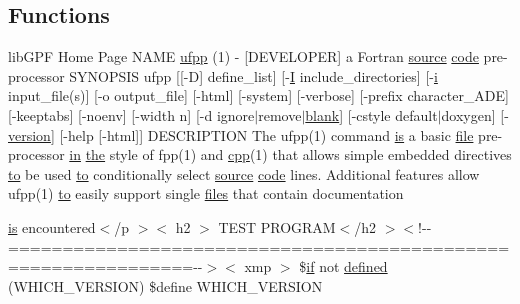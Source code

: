 \subsection*{Functions}
\begin{DoxyCompactItemize}
\item 
lib\+G\+PF Home Page N\+A\+ME \hyperlink{ufpp__overview_81_8txt_a97c20a96bcab81bc74c9d64b001f1202}{ufpp} (1) -\/ \mbox{[}D\+E\+V\+E\+L\+O\+P\+ER\mbox{]} a Fortran \hyperlink{ufpp__overview_81_8txt_a4d6669ece605d05985c83a04dd38e0ad}{source} \hyperlink{ufpp__overview_81_8txt_a74a0615f2d9c4a398d9126096f8092f8}{code} pre-\/processor S\+Y\+N\+O\+P\+S\+IS ufpp \mbox{[}\mbox{[}-\/D\mbox{]} define\+\_\+list\mbox{]} \mbox{[}-\/\hyperlink{continue_87_8txt_ae7b8826453d28f1bdb2fba7e889eb23b}{I} include\+\_\+directories\mbox{]} \mbox{[}-\/\hyperlink{intro__blas1_83_8txt_a8ba82a50c0c2c12d5f6a77f7e4651c0b}{i} input\+\_\+file(s)\mbox{]} \mbox{[}-\/o output\+\_\+file\mbox{]} \mbox{[}-\/html\mbox{]} \mbox{[}-\/system\mbox{]} \mbox{[}-\/verbose\mbox{]} \mbox{[}-\/prefix character\+\_\+\+A\+DE\mbox{]} \mbox{[}-\/keeptabs\mbox{]} \mbox{[}-\/noenv\mbox{]} \mbox{[}-\/width n\mbox{]} \mbox{[}-\/d ignore$\vert$remove$\vert$\hyperlink{M__stopwatch_83_8txt_ab1e613d54e5499697dd1189104a9f678}{blank}\mbox{]} \mbox{[}-\/cstyle default$\vert$doxygen\mbox{]} \mbox{[}-\/\hyperlink{inquiry__stopwatch_83_8txt_aee378be19d20935dd436517beda00ee4}{version}\mbox{]} \mbox{[}-\/help \mbox{[}-\/html\mbox{]}\mbox{]} D\+E\+S\+C\+R\+I\+P\+T\+I\+ON The ufpp(1) command \hyperlink{intro__blas1_83_8txt_a42a91df93f840595de3019ceb5d1df23}{is} a basic \hyperlink{what__overview_81_8txt_a447b56c526e8da30e0dc94673727ee25}{file} pre-\/processor \hyperlink{M__journal_83_8txt_afce72651d1eed785a2132bee863b2f38}{in} \hyperlink{M__stopwatch_83_8txt_a0f266597de2e57eb3aa964927bb30e14}{the} style of fpp(1) and \hyperlink{ufpp__overview_81_8txt_a7d3796ffd1c613d3b65678a150a215df}{cpp}(1) that allows simple embedded directives \hyperlink{M__stopwatch_83_8txt_a97209fd3e34ef701c0a9734280779cbb}{to} be used \hyperlink{M__stopwatch_83_8txt_a97209fd3e34ef701c0a9734280779cbb}{to} conditionally select \hyperlink{ufpp__overview_81_8txt_a4d6669ece605d05985c83a04dd38e0ad}{source} \hyperlink{ufpp__overview_81_8txt_a74a0615f2d9c4a398d9126096f8092f8}{code} lines. Additional features allow ufpp(1) \hyperlink{M__stopwatch_83_8txt_a97209fd3e34ef701c0a9734280779cbb}{to} easily support single \hyperlink{ufpp__overview_81_8txt_a5673f2294ff1627be40c90eae33141ca}{files} that contain documentation
\item 
\hyperlink{intro__blas1_83_8txt_a42a91df93f840595de3019ceb5d1df23}{is} encountered$<$/p $>$$<$ h2 $>$ T\+E\+ST P\+R\+O\+G\+R\+AM$<$/h2 $>$$<$!-\/-\/===============================================================-\/-\/$>$$<$ xmp $>$ \$\hyperlink{exit_87_8txt_a77395982f8d25581c808c40f3b634d90}{if} not \hyperlink{ufpp__overview_81_8txt_a199f35c6b903296e6ea1b146249c1ab3}{defined} (W\+H\+I\+C\+H\+\_\+\+V\+E\+R\+S\+I\+ON) \$define W\+H\+I\+C\+H\+\_\+\+V\+E\+R\+S\+I\+ON
$$
\end{DoxyCompactItemize}
